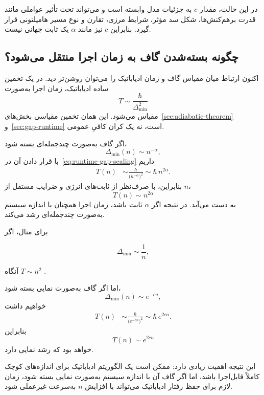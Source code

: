 در این حالت، مقدار $c$ به جزئیات مدل وابسته است و می‌تواند تحت تأثیر عواملی مانند قدرت برهم‌کنش‌ها، شکل سد مؤثر، شرایط مرزی، تقارن و نوع مسیر هامیلتونی قرار گیرد. بنابراین $c$ نیز مانند
$\alpha$ یک ثابت جهانی نیست.

\subsection{چگونه بسته‌شدن گاف به زمان اجرا منتقل می‌شود؟}

اکنون ارتباط میان مقیاس گاف و زمان ادیاباتیک را می‌توان روشن‌تر دید. در یک تخمین ساده ادیاباتیک، زمان اجرا به‌صورت
\begin{equation}
	T
	\sim
	\frac{\hbar}{\Delta_{\min}^{2}}
	\label{eq:runtime-gap-scaling}
\end{equation}
مقیاس می‌شود. این همان تخمین مقیاسی بخش‌های~\ref{sec:adiabatic-theorem} و~\ref{sec:gap-runtime} است، نه یک کران کافیِ عمومی.

اگر گاف به‌صورت چندجمله‌ای بسته شود،
\begin{equation}
	\Delta_{\min}(n)
	\sim
	n^{-\alpha},
\end{equation}
با قرار دادن آن در~\eqref{eq:runtime-gap-scaling} داریم
\begin{align}
	T(n)
	&\sim
	\frac{\hbar}
	{\bigl(n^{-\alpha}\bigr)^2}
	\sim
	\hbar\, n^{2\alpha}.
\end{align}
بنابراین، با صرف‌نظر از ثابت‌های انرژی و ضرایب مستقل از $n$،
\begin{equation}
	\boxed{
		T(n)\sim n^{2\alpha}
	}
\end{equation}
به دست می‌آید. در نتیجه اگر $\alpha$ ثابت باشد، زمان اجرا همچنان با اندازه سیستم به‌صورت چندجمله‌ای رشد می‌کند.

برای مثال، اگر

$$
\Delta_{\min}\sim\frac{1}{n},
$$

آنگاه
$
T\sim n^2
$
.

اما اگر گاف به‌صورت نمایی بسته شود،
\begin{equation}
	\Delta_{\min}(n)
	\sim
	e^{-cn},
\end{equation}
خواهیم داشت
\begin{align}
	T(n)
	&\sim
	\frac{\hbar}
	{\bigl(e^{-cn}\bigr)^2}
	\sim
	\hbar\, e^{2cn}.
\end{align}
بنابراین
\begin{equation}
	\boxed{
		T(n)\sim e^{2cn}
	}
\end{equation}
خواهد بود که رشد نمایی دارد.

این نتیجه اهمیت زیادی دارد: ممکن است یک الگوریتم ادیاباتیک برای اندازه‌های کوچک کاملاً قابل‌اجرا باشد، اما اگر گاف آن با اندازه سیستم به‌صورت نمایی بسته شود، زمان لازم برای حفظ رفتار ادیاباتیک می‌تواند با افزایش $n$ به‌سرعت غیرعملی شود.

